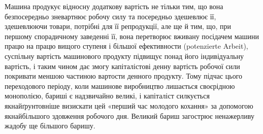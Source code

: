 Машина продукує відносну додаткову вартість не тільки тим,
що вона безпосередньо зневартнює робочу силу та посередньо
здешевлює її, здешевлюючи товари, потрібні для її репродукції,
але ще й тим, що, при першому спорадичному заведенні її, вона
перетворює вживану посідачем машини працю на працю вищого
ступеня і більшої ефективности (potenzierte Arbeit), суспільну
вартість машинового продукту підвищує понад його індивідуальну
вартість, і таким чином дає змогу капіталістові денну вартість
робочої сили покривати меншою частиною вартости денного продукту.
Тому підчас цього переходового періоду, коли машинове
виробництво лишається своєрідною монополією, бариші є надзвичайно
великі, і капіталіст силкується якнайґрунтовніше визискати
цей «перший час молодого кохання» за допомогою якнайбільшого
здовження робочого дня. Великий бариш загострює ненажерливу
жадобу ще більшого баришу.

